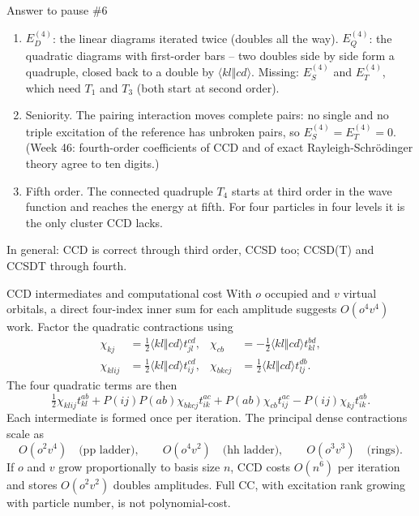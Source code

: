 \documentclass[aspectratio=169,10pt]{beamer}
\newcounter{thinkctr}
\newcommand{\thinka}[1]{%
  \vfill
  \begin{tcolorbox}[enhanced,colback=paleteal,colframe=teal,boxrule=1.2pt,arc=4pt,
    grow to left by=6mm,grow to right by=6mm,
    left=16pt,right=16pt,top=16pt,bottom=18pt,
    fonttitle=\bfseries\Large,fontupper=\large,
    title={Answer to pause \#\thethinkctr}]
  #1
  \end{tcolorbox}
  \vfill}
\newcommand{\as}[4]{\langle #1#2\Vert #3#4\rangle}
\begin{document}
\begin{frame}[shrink=1]{Answer to pause \#6}
\thinka{%
\begin{enumerate}
\item $E^{(4)}_D$: the linear diagrams iterated twice (doubles all the way). $E^{(4)}_Q$: the quadratic diagrams with first-order bars -- two doubles side by side form a quadruple, closed back to a double by $\as klcd$. Missing: $E^{(4)}_S$ and $E^{(4)}_T$, which need $T_1$ and $T_3$ (both start at second order).
\item Seniority. The pairing interaction moves complete pairs: no single and no triple excitation of the reference has unbroken pairs, so $E^{(4)}_S=E^{(4)}_T=0$. (Week 46: fourth-order coefficients of CCD and of exact Rayleigh-Schr\"odinger theory agree to ten digits.)
\item Fifth order. The connected quadruple $T_4$ starts at third order in the wave function and reaches the energy at fifth. For four particles in four levels it is the only cluster CCD lacks.
\end{enumerate}
In general: CCD is correct through third order, CCSD too; CCSD(T) and CCSDT through fourth.}
\end{frame}

\begin{frame}[shrink=3]{CCD intermediates and computational cost}
With $o$ occupied and $v$ virtual orbitals, a direct four-index inner sum for each amplitude suggests $O(o^4v^4)$ work. Factor the quadratic contractions using
\begin{align*}
 \chi_{kj}&=\tfrac12\as{k}{l}{c}{d}t_{jl}^{cd},&
 \chi_{cb}&=-\tfrac12\as{k}{l}{c}{d}t_{kl}^{bd},\\
 \chi_{klij}&=\tfrac12\as{k}{l}{c}{d}t_{ij}^{cd},&
 \chi_{bkcj}&=\tfrac12\as{k}{l}{c}{d}t_{lj}^{db}.
\end{align*}
The four quadratic terms are then
\[
 \tfrac12\chi_{klij}t_{kl}^{ab}
 +P(ij)P(ab)\chi_{bkcj}t_{ik}^{ac}
 +P(ab)\chi_{cb}t_{ij}^{ac}
 -P(ij)\chi_{kj}t_{ik}^{ab}.
\]
Each intermediate is formed once per iteration. The principal dense contractions scale as
\[
 O(o^2v^4)\quad\text{(pp ladder)},\qquad
 O(o^4v^2)\quad\text{(hh ladder)},\qquad O(o^3v^3)\quad\text{(rings)}.
\]
If $o$ and $v$ grow proportionally to basis size $n$, CCD costs $O(n^6)$ per iteration and stores $O(o^2v^2)$ doubles amplitudes. Full CC, with excitation rank growing with particle number, is not polynomial-cost.
\end{frame}

\end{document}
